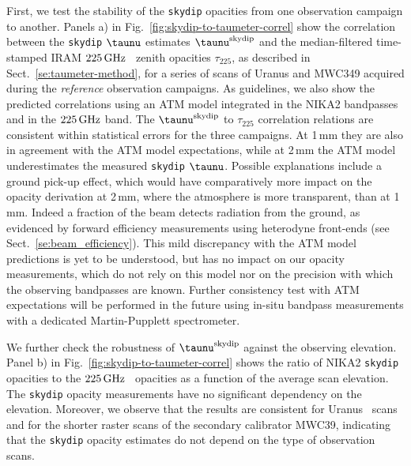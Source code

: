 First, we test the stability of the {\tt skydip} opacities from one
observation campaign to
another. Panels a) in Fig.~\ref{fig:skydip-to-taumeter-correl} show the
correlation between the {\tt skydip} $\taunu$ estimates $\taunu^{\rm{skydip}}$
and the median-filtered time-stamped IRAM $225\,\rm{GHz}$ \taumeter\ 
zenith opacities $\tau_{225}$, as described in
Sect.~\ref{se:taumeter-method}, for a series of scans
of Uranus and MWC349 acquired during the \emph{reference} observation
campaigns. As guidelines,
we also show the predicted correlations using an ATM model integrated
in the NIKA2 bandpasses and in the $225\,\rm{GHz}$ band. {\lp The
$\taunu^{\rm{skydip}}$ to $\tau_{225}$ correlation relations are
consistent within statistical errors for the three campaigns.}
At 1\,mm they are also in agreement with the ATM model expectations,
while at 2\,mm the ATM model underestimates the measured {\tt skydip}
$\taunu$. {\rev Possible explanations include a ground pick-up effect,
which would have comparatively more impact on the opacity derivation
at 2\,mm, where the atmosphere is more transparent, than at
1\,mm. Indeed a fraction of the beam detects radiation from the
ground, as evidenced by forward efficiency measurements using
heterodyne front-ends (see Sect.~\ref{se:beam_efficiency}).}
This mild discrepancy with the ATM model predictions is yet to be
understood, but has no impact on
our opacity measurements, which do not rely on this model nor on
the precision with which the observing bandpasses are known. {\lp
Further consistency test with ATM expectations will be performed in the
future using in-situ bandpass measurements with a
dedicated Martin-Pupplett spectrometer.}


We further check the robustness of $\taunu^{\rm{skydip}}$ against the
observing elevation. 
Panel b) in Fig.~\ref{fig:skydip-to-taumeter-correl} shows the ratio of NIKA2
{\tt skydip} opacities to the $225\,\rm{GHz}$ \taumeter\ opacities as a function of
the average scan elevation. The {\tt skydip} opacity measurements have
no significant dependency on the elevation. Moreover, we observe that
the results are consistent for Uranus \bm\ scans and for
the shorter raster scans of the secondary calibrator MWC39, indicating
that the {\tt skydip} opacity estimates do not depend on the type of
observation scans.


